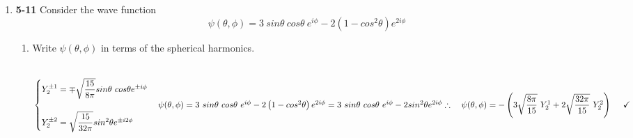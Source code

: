 \documentclass[fleqn]{article}
\begin{document}
\begin{enumerate}

    \pagebreak

    \item \textbf{5-11} Consider the wave function
    $$
      \psi(\theta, \phi)=3 ~ sin\theta ~ cos\theta ~ e^{i \phi}-2\left(1-cos^2\theta\right) e^{2i\phi}
    $$
    \begin{enumerate}
      \item Write $\psi(\theta, \phi)$ in terms of the spherical harmonics.

        \textcolor{hwColor}{
          \\
          $
            \begin{cases}
              Y^{\pm1}_2=\mp \sqrt{\dfrac{15}{8\pi}} sin\theta ~ cos\theta e^{\pm i \phi}
              \\
              \\
              Y^{\pm2}_2=\sqrt{\dfrac{15}{32\pi}} sin^2\theta e^{\pm i 2\phi}
            \end{cases}
            \\
            \\
            \\
            \psi(\theta, \phi)=3 ~ sin\theta ~ cos\theta ~ e^{i \phi}-2\left(1-cos^2\theta\right) e^{2i\phi}
            \\
            \\
            \\
            =3 ~ sin\theta ~ cos\theta ~ e^{i \phi}-2 sin^2\theta e^{2i\phi}
            \\
            \\
            \\
            \\
            \therefore ~~~  \psi(\theta, \phi)=-\left(3\sqrt{\dfrac{8 \pi}{15}} ~ Y^1_2+2 \sqrt{\dfrac{32 \pi}{15}} ~ Y^2_2\right) ~~~~ \checkmark
          $
          \\
          \\
        }



\end{enumerate}
\end{enumerate}
\end{document}
